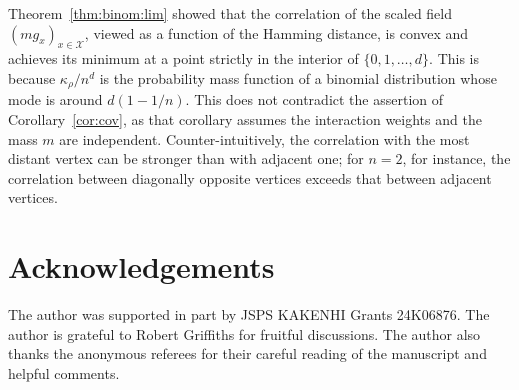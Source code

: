 \documentclass[a4paper,11pt]{article}
\theoremstyle{plain}
\theoremstyle{definition}
\begin{document}
Theorem~\ref{thm:binom:lim} showed that the correlation
of the scaled field $(mg_x)_{x\in\mathcal{X}}$, viewed
as a function of the Hamming distance, is convex and
achieves its minimum at a point strictly in the interior
of $\{0,1,\ldots,d\}$. This is because $\kappa_\rho/n^d$
is the probability mass function of a binomial distribution
whose mode is around $d(1-1/n)$. This does not contradict
the assertion of Corollary~\ref{cor:cov}, as that corollary
assumes the interaction weights and the mass $m$ are
independent. Counter-intuitively, the correlation
with the most distant vertex can be stronger than with
adjacent one; for $n=2$, for instance, the correlation
between diagonally opposite vertices exceeds that
between adjacent vertices.

\section*{Acknowledgements}
The author was supported in part by JSPS KAKENHI Grants
24K06876. The author is grateful to Robert Griffiths for
fruitful discussions. The author also thanks the anonymous
referees for their careful reading of the manuscript and
helpful comments.

\end{document}
